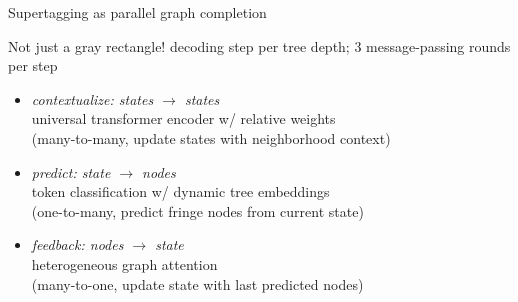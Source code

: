 \documentclass{beamer}
\newcommand{\dg}[1]{\textcolor{darkgreen}{#1}}
\newcommand{\dr}[1]{\textcolor{darkred}{#1}}
\newcommand{\hnorm}{\vphantom{()}}
\newcommand{\gqmarkat}[2]{\dg{\alt<#1>{#2}{???}}}
\newcommand{\rqmarkat}[2]{\dr{\alt<#1>{#2}{???}}}
\begin{document}
\begin{frame}{Supertagging as parallel graph completion}
\vfill
\end{frame}

\begin{frame}{Not just a gray rectangle!}
     decoding step per tree depth; 3 message-passing rounds per step
    \begin{itemize}
        \item \textit{contextualize: states $\to$ states}\\
        \quad \alert{universal transformer encoder w/ relative weights}\\
        \quad (many-to-many, update states with neighborhood context)
        \item \textit{predict: state $\to$ nodes}\\
        \quad \alert{token classification w/ dynamic tree embeddings}\\
        \quad (one-to-many, predict fringe nodes from current state)
        \item \textit{feedback: nodes $\to$ state}\\
        \quad \alert{heterogeneous graph attention}\\
        \quad (many-to-one, update state with last predicted nodes)
    \end{itemize} 
    \vfill
\end{frame}
\end{document}
